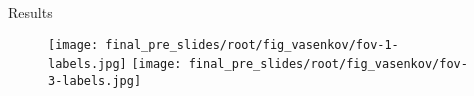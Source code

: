     \begin{frame}{Results}
    \begin{figure}
        \centering
        \texttt{[image: final\_pre\_slides/root/fig\_vasenkov/fov-1-labels.jpg]}
        \texttt{[image: final\_pre\_slides/root/fig\_vasenkov/fov-3-labels.jpg]}
        \label{fig:enter-label}
    \end{figure}
    \end{frame}
    